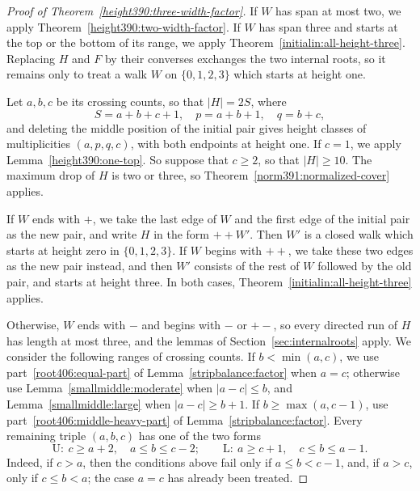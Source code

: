 \begin{proof}[Proof of Theorem~\ref{height390:three-width-factor}]
If $W$ has span at most two, we apply Theorem~\ref{height390:two-width-factor}.
If $W$ has span three and starts at the top or the bottom of its range, we apply Theorem~\ref{initialin:all-height-three}. Replacing $H$ and $F$ by their converses exchanges the two internal roots, so it remains
only to treat a walk $W$ on $\{0,1,2,3\}$ which starts at height one.

Let $a,b,c$ be its crossing counts, so that $|H|=2S$, where
\[
 S=a+b+c+1,\quad p=a+b+1,\quad q=b+c,
\]
and deleting the middle position of the initial pair gives height classes of multiplicities $(a,p,q,c)$,
with both endpoints at height one. If $c=1$, we apply
Lemma~\ref{height390:one-top}. So suppose that $c\ge2$, so that $|H|\ge10$. The maximum drop of $H$ is two or three, so Theorem~\ref{norm391:normalized-cover} applies.

If $W$ ends with $+$, we take the last edge of $W$ and the first edge of the initial pair as the new pair, and write $H$ in the form $++W'$. Then $W'$ is a closed walk
which starts at height zero in $\{0,1,2,3\}$. If $W$ begins with $++$, we take these
two edges as the new pair instead, and then $W'$ consists of the rest of $W$
followed by the old pair, and starts at height three. In both cases, Theorem~\ref{initialin:all-height-three} applies.

Otherwise, $W$ ends with $-$ and begins with $-$ or $+-$, so every
directed run of $H$ has length at most three, and the lemmas of Section~\ref{sec:internalroots} apply.
We consider the following ranges of crossing counts. If $b<\min(a,c)$, we use
part~\ref{root406:equal-part} of Lemma~\ref{stripbalance:factor} when $a=c$;
otherwise use Lemma~\ref{smallmiddle:moderate} when
$|a-c|\le b$, and Lemma~\ref{smallmiddle:large} when
$|a-c|\ge b+1$. If $b\ge\max(a,c-1)$, use
part~\ref{root406:middle-heavy-part} of Lemma~\ref{stripbalance:factor}.
Every remaining triple $(a,b,c)$ has one of the two forms
\[
 \mathrm U:\ c\ge a+2,\quad a\le b\le c-2;
 \qquad
 \mathrm L:\ a\ge c+1,\quad c\le b\le a-1.
\]
Indeed, if $c>a$, then the conditions above fail only if
$a\le b<c-1$, and, if $a>c$, only if $c\le b<a$;
the case $a=c$ has already been treated.


\end{proof}

